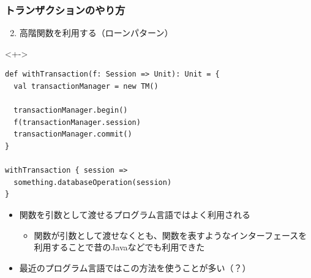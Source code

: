 \begin{frame}[fragile]
  \frametitle{トランザクションのやり方}

  \begin{enumerate}
    \setcounter{enumi}{1}
    \item<+-> \label{enum:loan} 高階関数を利用する（ローンパターン）
  \end{enumerate}

  \begin{uncoverenv}<+->
\begin{lstlisting}[style=scala]
def withTransaction(f: Session => Unit): Unit = {
  val transactionManager = new TM()

  transactionManager.begin()
  f(transactionManager.session)
  transactionManager.commit()
}

withTransaction { session =>
  something.databaseOperation(session)
}
\end{lstlisting}
  \end{uncoverenv}

  \begin{itemize}
    \item<+-> 関数を引数として渡せるプログラム言語ではよく利用される
    \begin{itemize}
      \item<+-> 関数が引数として渡せなくとも、関数を表すようなインターフェースを
      利用することで昔のJavaなどでも利用できた
    \end{itemize}
      
    \item<+-> 最近のプログラム言語ではこの方法を使うことが多い（？）
  \end{itemize}
\end{frame}

